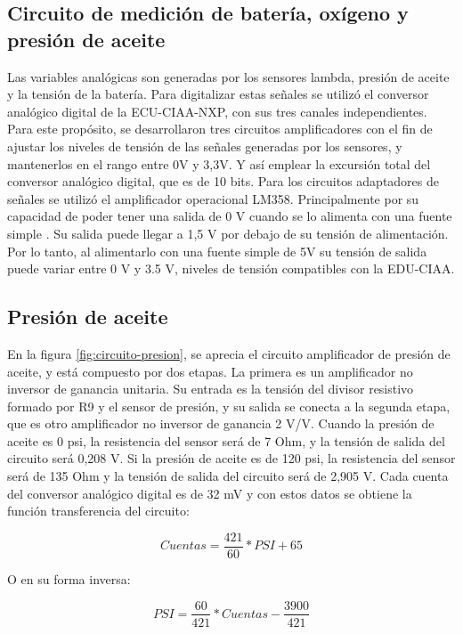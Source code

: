\subsection{Circuito de medición de batería, oxígeno y presión de aceite}

Las variables analógicas son generadas por los sensores lambda, presión de aceite y la tensión de la batería. Para digitalizar estas señales se utilizó el conversor analógico digital de la ECU-CIAA-NXP, con sus tres canales independientes. Para este propósito, se desarrollaron tres circuitos amplificadores con el fin de ajustar los niveles de tensión de las señales generadas por los sensores, y mantenerlos en el rango entre 0V y 3,3V. Y así emplear la excursión total del conversor analógico digital, que es de 10 bits. Para los circuitos adaptadores de señales se utilizó el amplificador operacional LM358. Principalmente por su capacidad de poder tener una salida de 0 V cuando se lo alimenta con una fuente simple \cite{lm358}. Su salida puede llegar a 1,5 V por debajo de su tensión de alimentación. Por lo tanto, al alimentarlo con una fuente simple de 5V su tensión de salida puede variar entre 0 V y 3.5 V, niveles de tensión compatibles con la EDU-CIAA.

\break

\subsection{Presión de aceite}

En la figura \ref{fig:circuito-presion}, se aprecia el circuito amplificador de presión de aceite, y está compuesto por dos etapas. La primera es un amplificador no inversor de ganancia unitaria. Su entrada es la tensión del divisor resistivo formado por R9 y el sensor de presión, y su salida se conecta a la segunda etapa, que es otro amplificador no inversor de ganancia 2 V/V.
Cuando la presión de aceite es 0 psi, la resistencia del sensor será de 7 Ohm, y la tensión de salida del circuito será 0,208 V. Si la presión de aceite es de 120 psi, la resistencia del sensor será de 135 Ohm y la tensión de salida del circuito será de 2,905 V. Cada cuenta del conversor analógico digital es de 32 mV y con estos datos se obtiene la función transferencia del circuito:

\[ Cuentas = \frac{421}{60} * PSI + 65\]

O en su forma inversa:

\[ PSI = \frac{60}{421} * Cuentas - \frac{3900}{421} \]

